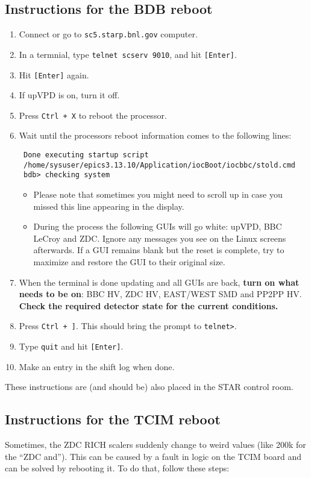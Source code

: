 \subsection{Instructions for the BDB reboot}
\label{bdbreboot}

\begin{enumerate}
\item Connect or go to \texttt{sc5.starp.bnl.gov} computer.
\item In a termnial, type \texttt{telnet scserv 9010}, and hit \texttt{[Enter]}.
\item Hit  \texttt{[Enter]} again.
\item If upVPD is on, turn it off.
\item Press \texttt{Ctrl + X} to reboot the processor.
\item Wait until the processors reboot information comes to the following lines:
\noindent
\begin{verbatim}
 Done executing startup script
 /home/sysuser/epics3.13.10/Application/iocBoot/iocbbc/stold.cmd
 bdb> checking system
\end{verbatim}

\begin{itemize}
 \item Please note that sometimes you might need to scroll up in case you missed this line appearing in the display.
 \item During the process the following GUIs will go white: upVPD, BBC LeCroy and ZDC\@. Ignore any messages you see on the Linux screens afterwards. If a GUI remains blank but the reset is complete, try to maximize and restore the GUI to their original size.
\end{itemize}

\item When the terminal is done updating and all GUIs are back, \textbf{turn on what needs to be on}: BBC HV, ZDC HV, EAST/WEST SMD and PP2PP HV\@. \textbf{Check the required detector state for the current conditions.}
\item Press \texttt{Ctrl + ]}. This should bring the prompt to \texttt{telnet>}.
\item Type \texttt{quit} and hit \texttt{[Enter]}.
\item Make an entry in the shift log when done.
\end{enumerate}

These instructions are (and should be) also placed in the STAR control room.

\subsection{Instructions for the TCIM reboot}
Sometimes, the ZDC RICH scalers suddenly change to weird values (like 200k for the ``ZDC and''). This can be caused by a fault in logic on the TCIM board and can be solved by rebooting it.
To do that, follow these steps:


